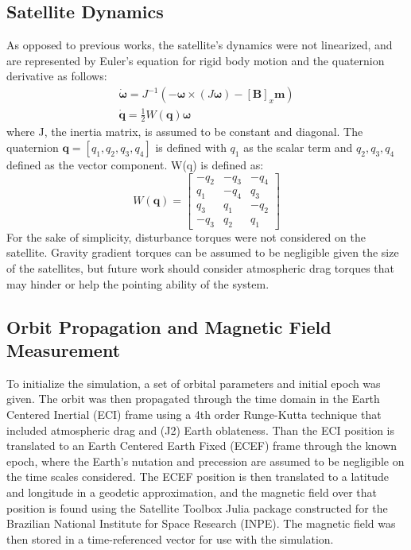 \documentclass[letterpaper, preprint, paper,11pt]{IAA-AAS}	%
\begin{document}
\subsection{Satellite Dynamics}
As opposed to previous works, the satellite’s dynamics were not linearized, and are represented by Euler’s equation for rigid body motion and the quaternion derivative as follows:
\begin{eqnarray}
	\label{eq:4}
	\mathbf{\dot{\omega}} = J^{-1}(-\mathbf{\omega} \times (J\mathbf{\omega})-[\mathbf{B}]_x\mathbf{m})\\
	\mathbf{\dot{q}} = \frac{1}{2} W(\mathbf{q}) \mathbf{\omega}
\end{eqnarray}
where J, the inertia matrix, is assumed to be constant and diagonal. The quaternion $\textbf{q} = [q_1,q_2,q_3,q_4]$ is defined with $q_1$ as the scalar term and $q_2, q_3, q_4$ defined as the vector component. W(q) is defined as:
\begin{equation}
	\label{eq:6}
	W(\mathbf{q}) =
	\begin{bmatrix}
	-q_2 & -q_3 & -q_4\\
	q_1 & -q_4 & q_3 \\
	q_3 & q_1 & -q_2\\
	-q_3 & q_2 & q_1
	\end{bmatrix}
\end{equation}
For the sake of simplicity, disturbance torques were not considered on the satellite. Gravity gradient torques can be assumed to be negligible given the size of the satellites, but future work should consider atmospheric drag torques that may hinder or help the pointing ability of the system. 

\subsection{Orbit Propagation and Magnetic Field Measurement}
To initialize the simulation, a set of orbital parameters and initial epoch was given. The orbit was then propagated through the time domain in the Earth Centered Inertial (ECI) frame using a 4th order Runge-Kutta technique that included atmospheric drag and (J2) Earth oblateness. Than the ECI position is translated to an Earth Centered Earth Fixed (ECEF) frame through the known epoch, where the Earth’s nutation and precession are assumed to be negligible on the time scales considered. The ECEF position is then translated to a latitude and longitude in a geodetic approximation, and the magnetic field over that position is found using the Satellite Toolbox Julia package constructed for the Brazilian National Institute for Space Research (INPE). The magnetic field was then stored in a time-referenced vector for use with the simulation. 
\end{document}

